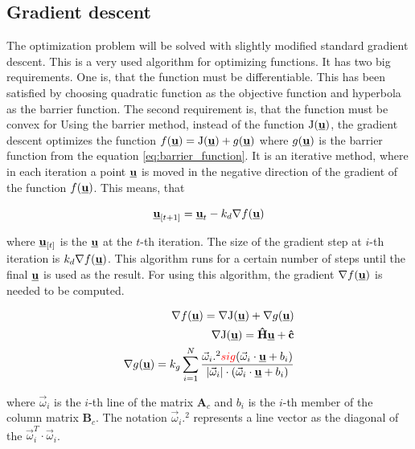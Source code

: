 \documentclass{article}
\newcommand{\uvec}{\textbf{\underline{u}}}
\newcommand{\macJ}{\mathrm{J}(\uvec)}
\newcommand{\macf}{f(\uvec)}
\newcommand{\macg}{g(\uvec)}
\newcommand{\macoi}{\vec{\omega}_i}
\begin{document}
\subsection{Gradient descent}
The optimization problem will be solved with slightly modified standard gradient descent. This is a very used algorithm for optimizing functions. It has two big requirements. One is, that the function must be differentiable. This has been satisfied by choosing quadratic function as the objective function and hyperbola as the barrier function. The second requirement is, that the function must be convex for Using the barrier method, instead of the function $\macJ$, the gradient descent optimizes the function $\macf = \macJ + \macg$ where $\macg$ is the barrier function from the equation \ref{eq:barrier_function}. 
It is an iterative method, where in each iteration a point $\uvec$ is moved in the negative direction of the gradient of the function $f(\uvec)$. This means, that 

\begin{equation}
\label{eq:gradient_descend}
\uvec_{[t+1]} = \uvec_{t} - k_d \nabla \macf 
\end{equation}

where $\uvec_{[t]}$ is the $\uvec$ at the $t$-th iteration. The size of the gradient step at $i$-th iteration is $k_d \nabla \macf$.  This algorithm runs for a certain number of steps until the final $\uvec$ is used as the result. For using this algorithm, the gradient $\nabla \macf$ is needed to be computed.

\begin{equation}
\begin{split}
\nabla \macf = \nabla \macJ + \nabla \macg\\
\nabla\macJ = \textbf{\^H}\uvec + \textbf{\^c}\\
\nabla \macg = k_g\sum_{i = 1}^N
\frac{\macoi.^2\textcolor{red}{sig}(\macoi\cdot\uvec+b_i)}
{|\macoi|\cdot(\macoi \cdot \uvec + b_i)}
\end{split}
\end{equation}

where $\macoi$ is the $i$-th line of the matrix $\textbf{A}_c$ and $b_i$ is the $i$-th member of the column matrix $\textbf{B}_c$. The notation $\macoi.^2$ represents a line vector as the diagonal of the $\macoi^T \cdot \macoi$. 
\end{document}
